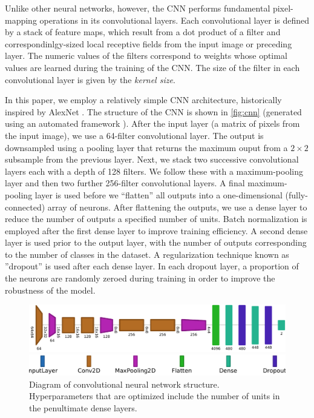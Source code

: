 \documentclass[Journal,letterpaper, SingleSpace, InsideFigs]{ascelike-new}
\begin{document}
Unlike other neural networks, however, the CNN performs fundamental pixel-mapping operations in its convolutional
layers. Each convolutional layer is defined by a stack of feature maps, which result from a dot product of a filter and
correspondinlgy-sized local receptive fields from the input image or preceding layer.  The numeric values of the filters
correspond to weights whose optimal values are learned during the training of the CNN.  The size of the filter in each
convolutional layer is given by the \textit{kernel size}.

In this paper, we employ a relatively simple CNN architecture, historically inspired by AlexNet \cite{krizhevsky2012imageneta}.
The structure of the CNN is shown in \autoref{fig:cnn} (generated using an automated  framework \cite{bauerle2021net2vis}).
After the input layer (a matrix of pixels from the input image), we use a 64-filter convolutional layer.
The output is downsampled using a pooling layer that returns the maximum ouput from a $2\times 2$ subsample from the previous layer.
Next, we stack two successive convolutional layers each with a depth of 128 filters.
We follow these with a maximum-pooling layer and then two further 256-filter convolutional layers.
A final maximum-pooling layer is used before we ``flatten'' all outputs into a one-dimensional (fully-connected) array of neurons. 
After flattening the outputs, we use a dense layer to reduce the number of outputs a specified number of units.
Batch normalization \cite{ioffe2015batch} is employed after the first dense layer to improve training efficiency.
A second dense layer is used prior to the output layer, with the number of outputs corresponding to the number of classes in the dataset.
A regularization technique known as ''dropout'' is used after each dense layer.
In each dropout layer, a proportion of the neurons are randomly zeroed during training in order to improve the robustness of the model.
\begin{figure}
    \centering
    \includegraphics[width=.9\textwidth]{net2vis/graph.pdf}
    
    \medskip
    
    \includegraphics[width=.7\textwidth]{figures/net2vis-name-labels/legend}
    \caption{Diagram of convolutional neural network structure. Hyperparameters that are optimized include the number of units in the penultimate dense layers.}
    \label{fig:cnn}
\end{figure}
\end{document}
